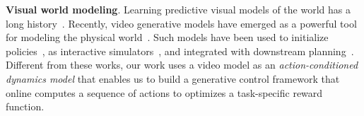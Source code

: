 \textbf{Visual world modeling}. Learning predictive visual models of the world has a long history~\cite{xue2016visual, oh2015action, ha2018world, oprea2020review}.  Recently, video generative models have emerged as a powerful tool for modeling the physical world~\cite{du2024learning, yang2023learning, liang2024dreamitate, ko2023learning, wang2024language, bharadhwaj2024gen2act, bar2024navigation}. Such models have been used to initialize policies~\cite{du2024learning, ko2023learning, bharadhwaj2024gen2act}, as interactive simulators~\cite{yang2023learning, liang2024dreamitate, bar2024navigation}, and integrated with downstream planning~\cite{du2023video,wang2024language}. 
Different from these works, our work uses a video model as an \emph{action-conditioned dynamics model} that enables us to build a generative control framework that online computes a sequence of actions to optimizes a task-specific reward function. 



